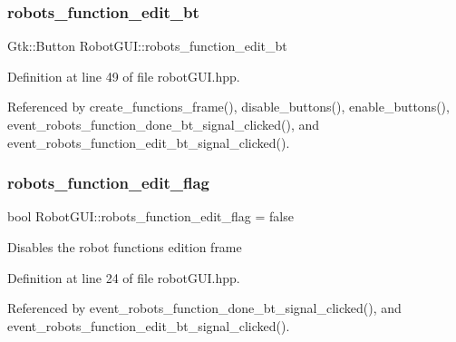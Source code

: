 \mbox{\label{class_robot_g_u_i_ac474c7d61bd07aaf26f75acb691e2971}} 
\subsubsection{\texorpdfstring{robots\+\_\+function\+\_\+edit\+\_\+bt}{robots\_function\_edit\_bt}}
{\footnotesize\ttfamily Gtk\+::\+Button Robot\+G\+U\+I\+::robots\+\_\+function\+\_\+edit\+\_\+bt\hspace{0.3cm}{\ttfamily [private]}}



Definition at line 49 of file robot\+G\+U\+I.\+hpp.



Referenced by create\+\_\+functions\+\_\+frame(), disable\+\_\+buttons(), enable\+\_\+buttons(), event\+\_\+robots\+\_\+function\+\_\+done\+\_\+bt\+\_\+signal\+\_\+clicked(), and event\+\_\+robots\+\_\+function\+\_\+edit\+\_\+bt\+\_\+signal\+\_\+clicked().

\mbox{\label{class_robot_g_u_i_afac83e97ea43120de2433cbe27413581}} 
\subsubsection{\texorpdfstring{robots\+\_\+function\+\_\+edit\+\_\+flag}{robots\_function\_edit\_flag}}
{\footnotesize\ttfamily bool Robot\+G\+U\+I\+::robots\+\_\+function\+\_\+edit\+\_\+flag = false\hspace{0.3cm}{\ttfamily [private]}}

Disables the robot functions edition frame 

Definition at line 24 of file robot\+G\+U\+I.\+hpp.



Referenced by event\+\_\+robots\+\_\+function\+\_\+done\+\_\+bt\+\_\+signal\+\_\+clicked(), and event\+\_\+robots\+\_\+function\+\_\+edit\+\_\+bt\+\_\+signal\+\_\+clicked().

\mbox{\label{class_robot_g_u_i_af29bd5e935aaf337c5e2afaa4dd2119a}} 
